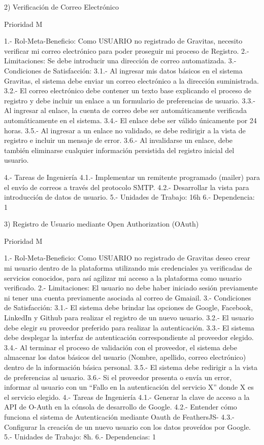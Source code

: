 \newpage


2) Verificación de Correo Electrónico

	Prioridad M

	1.-	Rol-Meta-Beneficio: Como USUARIO no registrado de Gravitas, necesito verificar mi correo electrónico para poder proseguir mi proceso de Registro.
	2.- 	Limitaciones: Se debe introducir una dirección de correo automatizada.
	3.-	Condiciones de Satisfacción:
		3.1.- Al ingresar mis datos básicos en el sistema Gravitas, el sistema debe enviar un correo electrónico a la dirección suministrada.
		3.2.- El correo electrónico debe contener un texto base explicando el proceso de registro y debe incluir un enlace a un formulario de preferencias de usuario.
		3.3.- Al ingresar al enlace, la cuenta de correo debe ser automáticamente verificada automáticamente en el sistema.
		3.4.- El enlace debe ser válido únicamente por 24 horas.
		3.5.- Al ingresar a un enlace no validado, se debe redirigir a la vista de registro e incluir un mensaje de error.
		3.6.- Al invalidarse un enlace, debe también eliminarse cualquier información persistida del registro inicial del usuario.

	4.- 	Tareas de Ingeniería
		4.1.- Implementar un remitente programado (mailer) para el envío de  correos a través del protocolo SMTP.
		4.2.- Desarrollar la vista para introducción de datos de usuario.
	5.-	Unidades de Trabajo: 16h
	6.-	Dependencia: 1


3) Registro de Usuario mediante Open Authorization (OAuth)

	Prioridad M

	1.-	Rol-Meta-Beneficio: Como USUARIO no registrado de Gravitas deseo crear mi usuario dentro de la plataforma utilizando mis credenciales ya verificadas de servicios conocidos, para así agilizar mi acceso a la plataforma como usuario verificado.
	2.-	Limitaciones: El usuario no debe haber iniciado sesión previamente ni tener una cuenta previamente asociada al correo de Gmaiail.
	3.-	Condiciones de Satisfacción:
		3.1.- El sistema debe brindar las opciones de Google, Facebook, LinkedIn y Github para realizar el registro de un nuevo usuario.
		3.2.-	El usuario debe elegir su proveedor preferido para realizar la autenticación.
		3.3.-	El sistema debe desplegar la interfaz de autenticación correspondiente al proveedor elegido.
		3.4.-	Al terminar el proceso de validación con el proveedor, el sistema debe almacenar los datos básicos del usuario (Nombre, apellido, correo electrónico) dentro de la información básica personal.
		3.5.-	El sistema debe redirigir a la vista de preferencias al usuario.
		3.6.-	Si el proveedor presenta o envía un error, informar al usuario con un “Fallo en la autenticación del servicio X” donde X es el servicio elegido.
	4.- Tareas de Ingeniería
		4.1.- Generar la clave de acceso a la API de O-Auth en la cónsola de desarrollo de Google.
		4.2.- Entender cómo funciona el sistema de Autenticación mediante Oauth de FeathersJS-
		4.3.- Configurar la creación de un nuevo usuario con los datos proveídos por Google.
	5.- Unidades de Trabajo: 8h.
	6.- Dependencias: 1


